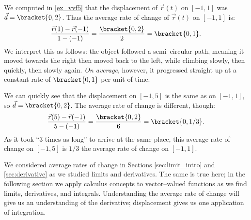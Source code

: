 {We computed in \autoref{ex_vvf5} that the displacement of $\vec r(t)$ on $[-1,1]$ was $\vec d =\bracket{0,2}$. Thus the average rate of change of $\vec r(t)$ on $[-1,1]$ is:
$$\frac{\vec r(1) -\vec r(-1)}{1-(-1)} = \frac{\bracket{0,2}}{2} =\bracket{0,1}.$$
We interpret this as follows: the object followed a semi--circular path, meaning it moved towards the right then moved back to the left, while climbing slowly, then quickly, then slowly again. \emph{On average}, however, it progressed straight up at a constant rate of $\bracket{0,1}$ per unit of time.

We can quickly see that the displacement on $[-1,5]$ is the same as on $[-1,1]$, so $\vec d =\bracket{0,2}$. The average rate of change is different, though:
$$\frac{\vec r(5)-\vec r(-1)}{5-(-1)} = \frac{\bracket{0,2}}{6} =\bracket{0,1/3}.$$
As it took ``3 times as long'' to arrive at the same place, this average rate of change on $[-1,5]$ is $1/3$ the average rate of change on $[-1,1]$.}

We considered average rates of change in Sections \ref{sec:limit_intro} and \ref{sec:derivative} as we studied limits and derivatives. The same is true here; in the following section we apply calculus concepts to vector--valued functions as we find limits, derivatives, and integrals. Understanding the average rate of change will give us an understanding of the derivative; displacement gives us one application of integration.

